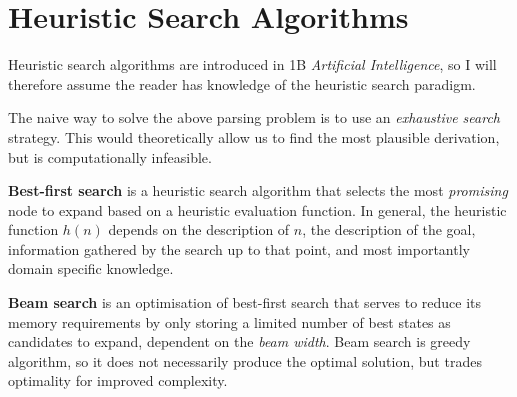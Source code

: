 \documentclass[12pt,a4paper,twoside,openright]{report}
\theoremstyle{definition}
\begin{document}
\section{Heuristic Search Algorithms}

Heuristic search algorithms are introduced in 1B \textit{Artificial Intelligence}, so I will therefore assume the reader has knowledge of the heuristic search paradigm.

The naive way to solve the above parsing problem is to use an \textit{exhaustive search} strategy. This would theoretically allow us to find the most plausible derivation, but is computationally infeasible.

\textbf{Best-first search} is a heuristic search algorithm that selects the most \textit{promising} node to expand based on a heuristic evaluation function. 
In general, the heuristic function $h(n)$ depends on  the description of $n$, the description of the goal, information gathered by the search up to that point, and most importantly domain specific knowledge\cite{pearlHeuristicsIntelligentSearch1984}.

\textbf{Beam search} is an optimisation of best-first search that serves to reduce its memory requirements by only storing a limited number of best states as candidates to expand, dependent on the \textit{beam width}. Beam search is greedy algorithm, so it does not necessarily produce the optimal solution, but trades optimality for improved complexity.

%
\end{document}
